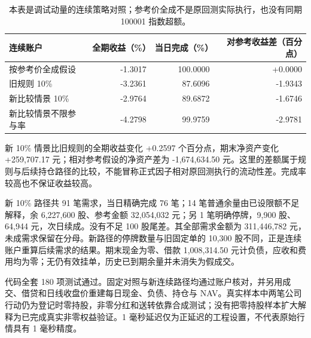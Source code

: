 \begin{table}[H]\centering\small\begin{tabular}{lrrr}

\toprule 连续账户 &全期收益（\%）&当日完成（\%）&对参考收益差（百分点）\\\midrule

按参考价全成假设 &-1.3017&100.0000&+0.0000\\

旧规则 10\% &-3.2361&87.6096&-1.9343\\

新比较情景 10\% &-2.9764&89.6872&-1.6746\\

新比较情景不限参与率 &-4.2798&99.9759&-2.9781\\

\bottomrule\end{tabular}

\caption{本表是调试动量的连续策略对照；参考价全成不是原回测实际执行，也没有同期 100001 指数超额。}\end{table}

新 10\% 情景比旧规则的全期收益变化 +0.2597 个百分点，期末净资产变化 +259,707.17 元；相对参考假设的净资产差为 -1,674,634.50 元。这里的差额属于规则与后续持仓路径的比较，不能冒称正式因子相对原回测执行的流动性差。完成率较高也不保证收益较高。

新 10\% 路径共 91 笔需求，当日精确完成 76 笔；14 笔普通余量由已设限额不足解释，余 6,227,600 股、参考金额 32,054,032 元；另 1 笔明确停牌，9,900 股、64,944 元，次日续成。没有不足 100 股尾差。其全部需求金额为 311,446,782 元，未成需求保留在分母。新路径的停牌数量与旧固定单的 10,300 股不同，正是连续账户重算后续需求的结果。期末现金为零、借款 1,008,314.50 元计负债，应收和费用均为零；无仍有效挂单，历史已到期余量并未消失为假成交。


代码全套 180 项测试通过。固定对照与新连续路径均通过账户核对，并另用成交、借贷和日线收盘价重建每日现金、负债、持仓与 NAV。真实样本中两笔公司行动仍为登记时零持股，非零分红和送转依靠合成测试；没有把零持股样本扩大解释为已完成真实非零权益验证。1 毫秒延迟仅为正延迟的工程设置，不代表原始行情具有 1 毫秒精度。
